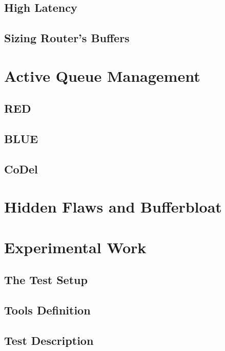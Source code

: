 \documentclass[letter, 11pt]{article}
\theoremstyle{plain}
\theoremstyle{definition}
\begin{document}
\subsection{High Latency}

\subsection{Sizing Router's Buffers}


\newpage

\section{Active Queue Management}

\subsection{RED}

\subsection{BLUE}

\subsection{CoDel}


\newpage

\section{Hidden Flaws and Bufferbloat}


\newpage

\section{Experimental Work}


\subsection{The Test Setup}


\subsection{Tools Definition}


\subsection{Test Description}

	
\end{document}
